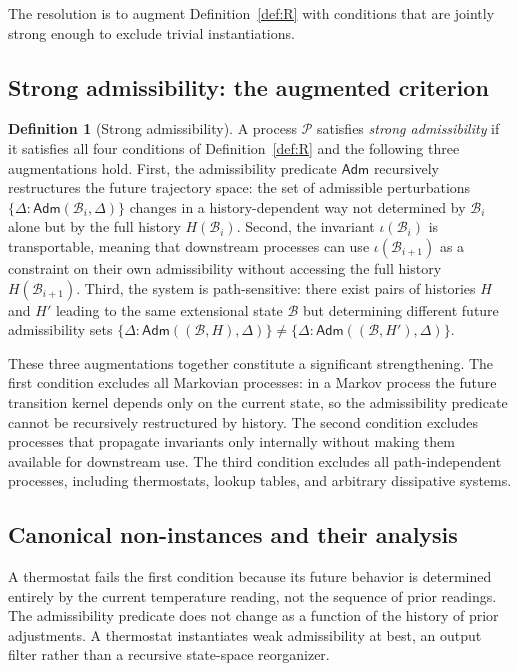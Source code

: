 \documentclass[12pt, a4paper]{article}
\theoremstyle{plain}
\theoremstyle{definition}
\newtheorem{definition}[theorem]{Definition}
\theoremstyle{remark}
\newcommand{\Bcal}{\mathcal{B}}
\begin{document}
The resolution is to augment Definition~\ref{def:R} with conditions that are jointly
strong enough to exclude trivial instantiations.

\subsection{Strong admissibility: the augmented criterion}

\begin{definition}[Strong admissibility]
  A process $\mathcal{P}$ satisfies \emph{strong admissibility} if it satisfies all
  four conditions of Definition~\ref{def:R} and the following three augmentations hold.
  First, the admissibility predicate $\mathsf{Adm}$ recursively restructures the future
  trajectory space: the set of admissible perturbations $\{\Delta : \mathsf{Adm}(\Bcal_i,
  \Delta)\}$ changes in a history-dependent way not determined by $\Bcal_i$ alone but
  by the full history $H(\Bcal_i)$.
  Second, the invariant $\iota(\Bcal_i)$ is transportable, meaning that downstream
  processes can use $\iota(\Bcal_{i+1})$ as a constraint on their own admissibility
  without accessing the full history $H(\Bcal_{i+1})$.
  Third, the system is path-sensitive: there exist pairs of histories $H$ and $H'$
  leading to the same extensional state $\Bcal$ but determining different future
  admissibility sets $\{\Delta : \mathsf{Adm}((\Bcal, H), \Delta)\} \neq \{\Delta :
  \mathsf{Adm}((\Bcal, H'), \Delta)\}$.
\end{definition}

These three augmentations together constitute a significant strengthening. The first
condition excludes all Markovian processes: in a Markov process the future transition
kernel depends only on the current state, so the admissibility predicate cannot be
recursively restructured by history. The second condition excludes processes that
propagate invariants only internally without making them available for downstream use.
The third condition excludes all path-independent processes, including thermostats,
lookup tables, and arbitrary dissipative systems.

\subsection{Canonical non-instances and their analysis}

A thermostat fails the first condition because its future behavior is determined
entirely by the current temperature reading, not the sequence of prior readings.
The admissibility predicate does not change as a function of the history of prior
adjustments. A thermostat instantiates weak admissibility at best, an output filter
rather than a recursive state-space reorganizer.
\end{document}
